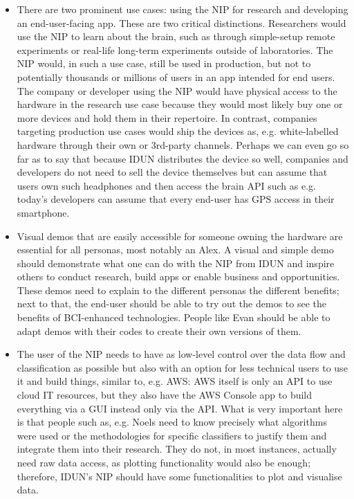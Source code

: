 \begin{itemize}
  \item There are two prominent use cases: using the NIP for research and developing an end-user-facing app. These are two critical distinctions. Researchers would use the NIP to learn about the brain, such as through simple-setup remote experiments or real-life long-term experiments outside of laboratories. The NIP would, in such a use case, still be used in production, but not to potentially thousands or millions of users in an app intended for end users. The company or developer using the NIP would have physical access to the hardware in the research use case because they would most likely buy one or more devices and hold them in their repertoire. In contrast, companies targeting production use cases would ship the devices as, e.g. white-labelled hardware through their own or 3rd-party channels. Perhaps we can even go so far as to say that because IDUN distributes the device so well, companies and developers do not need to sell the device themselves but can assume that users own such headphones and then access the brain API such as e.g. today's developers can assume that every end-user has GPS access in their smartphone.
  \item Visual demos that are easily accessible for someone owning the hardware are essential for all personas, most notably an Alex. A visual and simple demo should demonstrate what one can do with the NIP from IDUN and inspire others to conduct research, build apps or enable business and opportunities. These demos need to explain to the different personas the different benefits; next to that, the end-user should be able to try out the demos to see the benefits of BCI-enhanced technologies. People like Evan should be able to adapt demos with their codes to create their own versions of them.
  \item The user of the NIP needs to have as low-level control over the data flow and classification as possible but also with an option for less technical users to use it and build things, similar to, e.g. AWS: AWS itself is only an API to use cloud IT resources, but they also have the AWS Console app to build everything via a GUI instead only via the API. What is very important here is that people such as, e.g. Noels need to know precisely what algorithms were used or the methodologies for specific classifiers to justify them and integrate them into their research. They do not, in most instances, actually need raw data access, as plotting functionality would also be enough; therefore, IDUN's NIP should have some functionalities to plot and visualise data.

\end{itemize}
